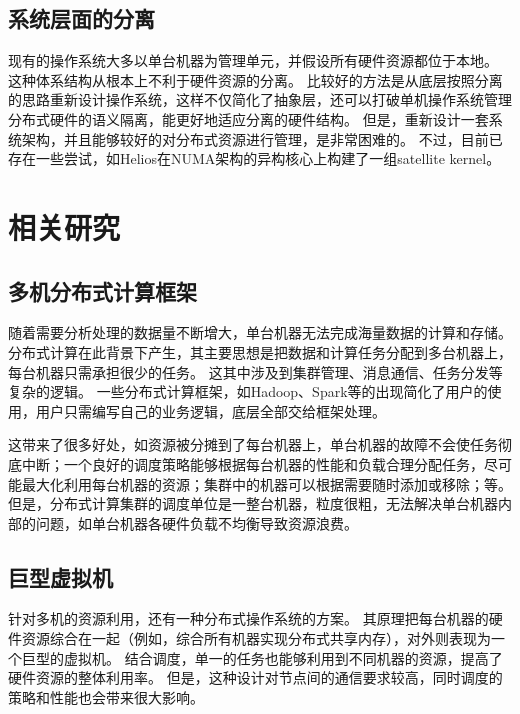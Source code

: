 \subsection{系统层面的分离}

现有的操作系统大多以单台机器为管理单元，并假设所有硬件资源都位于本地。
这种体系结构从根本上不利于硬件资源的分离。
比较好的方法是从底层按照分离的思路重新设计操作系统，这样不仅简化了抽象层，还可以打破单机操作系统管理分布式硬件的语义隔离，能更好地适应分离的硬件结构。
但是，重新设计一套系统架构，并且能够较好的对分布式资源进行管理，是非常困难的。
不过，目前已存在一些尝试，如Helios\cite{nightingale2009helios}在NUMA架构的异构核心上构建了一组satellite kernel。


\section{相关研究}

\subsection{多机分布式计算框架}

随着需要分析处理的数据量不断增大，单台机器无法完成海量数据的计算和存储。
分布式计算在此背景下产生，其主要思想是把数据和计算任务分配到多台机器上，每台机器只需承担很少的任务。
这其中涉及到集群管理、消息通信、任务分发等复杂的逻辑。
一些分布式计算框架，如Hadoop、Spark等的出现简化了用户的使用，用户只需编写自己的业务逻辑，底层全部交给框架处理。

这带来了很多好处，如资源被分摊到了每台机器上，单台机器的故障不会使任务彻底中断；一个良好的调度策略能够根据每台机器的性能和负载合理分配任务，尽可能最大化利用每台机器的资源；集群中的机器可以根据需要随时添加或移除；等。
但是，分布式计算集群的调度单位是一整台机器，粒度很粗，无法解决单台机器内部的问题，如单台机器各硬件负载不均衡导致资源浪费。

\subsection{巨型虚拟机}

针对多机的资源利用，还有一种分布式操作系统的方案。
其原理把每台机器的硬件资源综合在一起（例如，综合所有机器实现分布式共享内存），对外则表现为一个巨型的虚拟机。
结合调度，单一的任务也能够利用到不同机器的资源，提高了硬件资源的整体利用率。
但是，这种设计对节点间的通信要求较高，同时调度的策略和性能也会带来很大影响。

